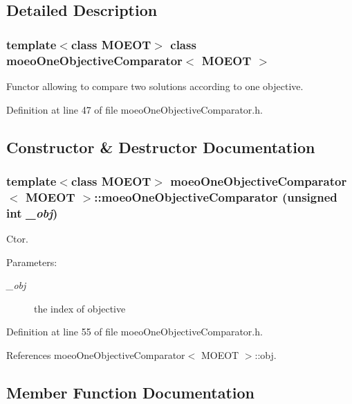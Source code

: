 \subsection{Detailed Description}
\subsubsection*{template$<$class MOEOT$>$ class moeo\-One\-Objective\-Comparator$<$ MOEOT $>$}

Functor allowing to compare two solutions according to one objective. 



Definition at line 47 of file moeo\-One\-Objective\-Comparator.h.

\subsection{Constructor \& Destructor Documentation}
\subsubsection{\setlength{\rightskip}{0pt plus 5cm}template$<$class MOEOT$>$ \bf{moeo\-One\-Objective\-Comparator}$<$ MOEOT $>$::\bf{moeo\-One\-Objective\-Comparator} (unsigned int {\em \_\-obj})\hspace{0.3cm}{\tt  [inline]}}\label{classmoeoOneObjectiveComparator_be1249440803553ef868182019d49e4d}


Ctor. 

\begin{Desc}
\item[Parameters:]
\begin{description}
\item[{\em \_\-obj}]the index of objective \end{description}
\end{Desc}


Definition at line 55 of file moeo\-One\-Objective\-Comparator.h.

References moeo\-One\-Objective\-Comparator$<$ MOEOT $>$::obj.

\subsection{Member Function Documentation}
